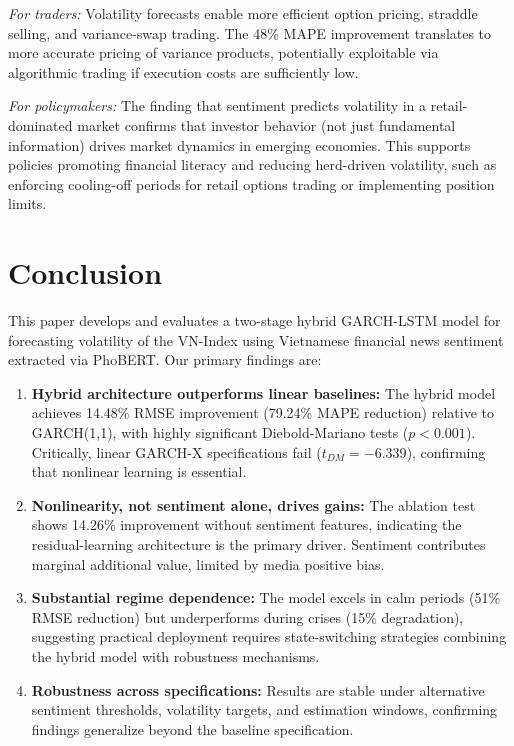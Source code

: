 \textit{For traders:} Volatility forecasts enable more efficient option pricing, straddle selling, and variance-swap trading. The 48\% MAPE improvement translates to more accurate pricing of variance products, potentially exploitable via algorithmic trading if execution costs are sufficiently low.

\textit{For policymakers:} The finding that sentiment predicts volatility in a retail-dominated market confirms that investor behavior (not just fundamental information) drives market dynamics in emerging economies. This supports policies promoting financial literacy and reducing herd-driven volatility, such as enforcing cooling-off periods for retail options trading or implementing position limits.

\section{Conclusion}

This paper develops and evaluates a two-stage hybrid GARCH-LSTM model for forecasting volatility of the VN-Index using Vietnamese financial news sentiment extracted via PhoBERT. Our primary findings are:

\begin{enumerate}
    \item \textbf{Hybrid architecture outperforms linear baselines:} The hybrid model achieves 14.48\% RMSE improvement (79.24\% MAPE reduction) relative to GARCH(1,1), with highly significant Diebold-Mariano tests ($p < 0.001$). Critically, linear GARCH-X specifications fail ($t_{DM} = -6.339$), confirming that nonlinear learning is essential.
    
    \item \textbf{Nonlinearity, not sentiment alone, drives gains:} The ablation test shows 14.26\% improvement without sentiment features, indicating the residual-learning architecture is the primary driver. Sentiment contributes marginal additional value, limited by media positive bias.
    
    \item \textbf{Substantial regime dependence:} The model excels in calm periods (51\% RMSE reduction) but underperforms during crises (15\% degradation), suggesting practical deployment requires state-switching strategies combining the hybrid model with robustness mechanisms.
    
    \item \textbf{Robustness across specifications:} Results are stable under alternative sentiment thresholds, volatility targets, and estimation windows, confirming findings generalize beyond the baseline specification.
\end{enumerate}

